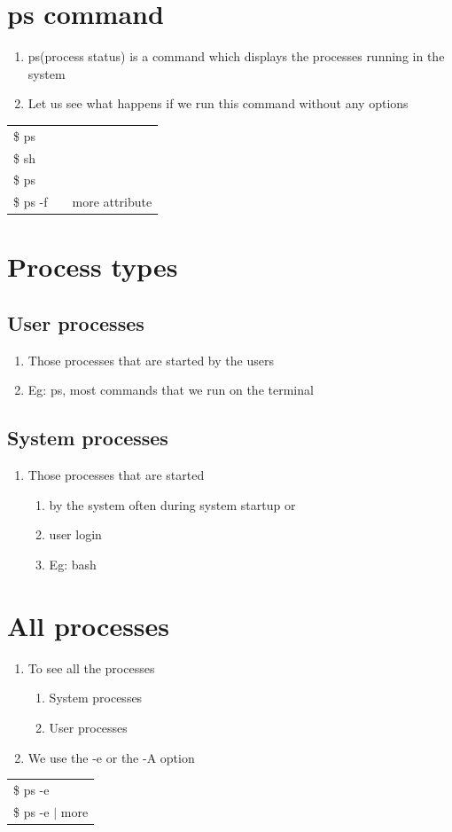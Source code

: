 \documentclass[12pt, a4paper]{report}
\begin{document}
\section{ps command}
\begin{enumerate}
\item ps(process status) is a command which displays the processes running in the system
\item Let us see what happens if we run this command without any options
\end{enumerate}
\begin{tabular}{|lcr|}\hline
\$ ps&&\\
\$ sh&&\\
\$ ps&&\\
\$ ps -f && more attribute\\ \hline
\end{tabular}
\section{Process types}
\subsection{User processes}
\begin{enumerate}
\item Those processes that are started by the users
\item Eg: ps, most commands that we run on the terminal
\end{enumerate}
\subsection{System processes}
\begin{enumerate}
\item Those processes that are started
\begin{enumerate}
\item by the system often during system startup or
\item user login
\item Eg: bash
\end{enumerate}
\end{enumerate}
\section{All processes}
\begin{enumerate}
\item To see all the processes
\begin{enumerate}
\item System processes
\item User processes
\end{enumerate}
\item We use the -e or the -A option
\end{enumerate}
\begin{tabular}{|l|}\hline
\$ ps -e\\
\$ ps -e $|$ more\\ \hline
\end{tabular}
%
\end{document}
